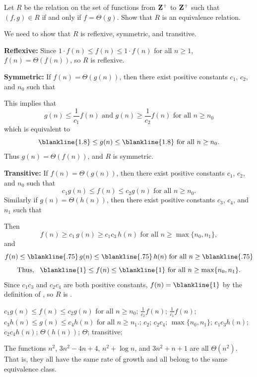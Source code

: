 \begin{fib}
Let $R$ be the relation on the set of functions from ${\bf Z}^{+}$
to ${\bf Z}^{+}$ such that $(f,g)\in R$ if and only if $f=\Theta(g)$.
Show that $R$ is an equivalence relation.
\begin{pf}
We need to show that $R$ is reflexive, symmetric, and transitive.

\noindent
{\bf Reflexive:}
Since $1\cdot f(n)\leq f(n) \leq 1\cdot f(n)$ for all $n\geq 1$, $f(n)=\Theta(f(n))$, so
$R$ is reflexive.

\noindent
{\bf Symmetric:} 
If $f(n)=\Theta(g(n))$, then there exist positive constants $c_1$, $c_2$, and $n_0$ such that
\blanklinefill

\noindent
This implies that
$$g(n)\leq \frac{1}{ c_1} f(n) \mbox{ and } g(n)\geq \frac{1}{ c_2} f(n) \mbox{ for all } n\geq n_0$$
which is equivalent to 
$$\blankline{1.8}\leq g(n) \leq\blankline{1.8}\mbox{ for all } n\geq n_0.$$
Thus $g(n)=\Theta(f(n))$, and $R$ is symmetric.

\noindent
{\bf Transitive:}
If $f(n)=\Theta(g(n))$, then there exist positive constants $c_1$, $c_2$, and $n_0$ such that
$$c_1 g(n)\leq f(n) \leq c_2 g(n) \mbox{ for all } n\geq n_0.$$
Similarly
if $g(n)=\Theta(h(n))$, then there exist positive constants $c_3$, $c_4$, and $n_1$ such that
\blanklinefill

\noindent
Then 
$$f(n)\geq c_1\, g(n) \geq c_1c_3\, h(n) \mbox{ for all } n\geq \max\{n_0,n_1\},$$
and 
$$f(n)\leq \blankline{.75}\, g(n) \leq \blankline{.75}\, h(n) \mbox{ for all } n\geq \blankline{.75} $$
$$\mbox{Thus, \, } \blankline{1} \leq f(n) \leq \blankline{1}  \mbox{ for all } n\geq \max\{n_0,n_1\}.$$
Since $c_1 c_3$ and $c_2 c_4$ are both positive constants, 
$f(n)=\blankline{1}$ by the definition of , so $R$ is .
\end{pf}
\begin{answer}
$c_1 g(n)\leq f(n) \leq c_2 g(n) \mbox{ for all } n\geq n_0$;
$\frac{1}{ c_2} f(n)$;
$\frac{1 }{ c_1} f(n)$;
$c_3 h(n)\leq g(n) \leq c_4 h(n) \mbox{ for all } n\geq n_1.$;
$c_2$; $c_2 c_4$;
$\max\{n_0,n_1\}$;
$c_1 c_3 h(n)$;
$c_2 c_4 h(n)$;
$\Theta(h(n))$;
$\Theta$;
transitive;
\end{answer}
\end{fib}

\begin{exa}
The functions $n^2$, $3n^2-4n+4$,
$n^2+\log n$, and $3n^2+n+1$ are all $\Theta(n^2)$.  That is, they all have the 
same rate of growth and all belong to the same equivalence class. 
\end{exa}

